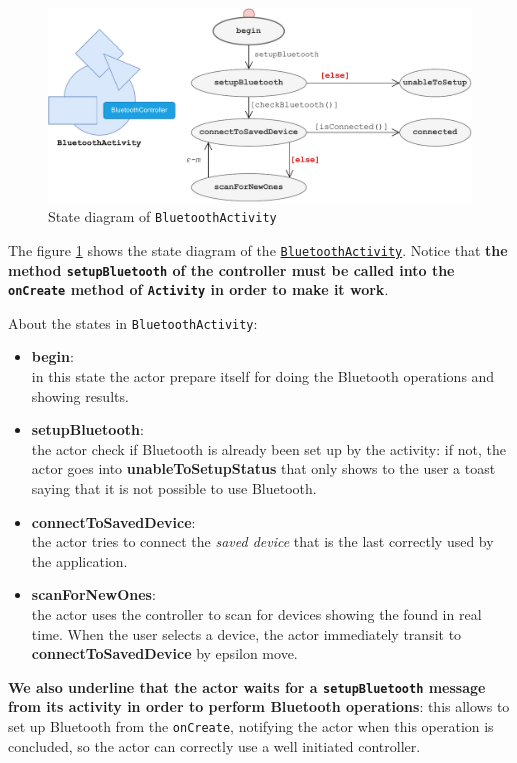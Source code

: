 \begin{figure}[h!]
	\centering
	\includegraphics[width=\textwidth]{img/bluetoothactivity.pdf}
	\caption{State diagram of \texttt{BluetoothActivity}}
	\label{fig:bluetoothactivity}
\end{figure}

The figure \ref{fig:bluetoothactivity} shows the state diagram of the \href{https://github.com/LucaLand/MobileSystemsProject-LL/blob/0.9.1/app/src/main/java/it/unibo/mobilesystems/BluetoothConnectionActivity.kt}{\texttt{BluetoothActivity}}. Notice that \textbf{the method \texttt{setupBluetooth} of the controller must be called into the \texttt{onCreate} method of \texttt{Activity} in order to make it work}.

About the states in \texttt{BluetoothActivity}:
\begin{itemize}
	\item \textbf{begin}:\\
	in this state the actor prepare itself for doing the Bluetooth operations and showing results.
	
	\item \textbf{setupBluetooth}:\\
	the actor check if Bluetooth is already been set up by the activity: if not, the actor goes into \textbf{unableToSetupStatus} that only shows to the user a toast saying that it is not possible to use Bluetooth.
	
	\item \textbf{connectToSavedDevice}:\\
	the actor tries to connect the \textit{saved device} that is the last correctly used by the application.
	
	\item \textbf{scanForNewOnes}:\\
	the actor uses the controller to scan for devices showing the found in real time. When the user selects a device, the actor immediately transit to \textbf{connectToSavedDevice} by epsilon move.
	
\end{itemize}
\textbf{We also underline that the actor waits for a \texttt{setupBluetooth} message from its activity in order to perform Bluetooth operations}: this allows to set up Bluetooth from the \texttt{onCreate}, notifying the actor when this operation is concluded, so the actor can correctly use a well initiated controller. 

